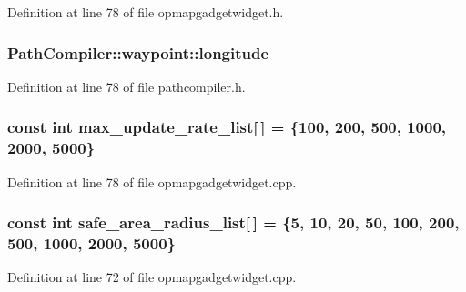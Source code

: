 Definition at line 78 of file opmapgadgetwidget.\-h.

\hypertarget{group___o_p_map_plugin_ga698954b834d77d2eb539e287bc6bc9e0}{
\subsubsection[{longitude}]{ Path\-Compiler\-::waypoint\-::longitude}}\label{group___o_p_map_plugin_ga698954b834d77d2eb539e287bc6bc9e0}


Definition at line 78 of file pathcompiler.\-h.

\hypertarget{group___o_p_map_plugin_ga924197d237c4236b05e045cf5b299e51}{
\subsubsection[{max\-\_\-update\-\_\-rate\-\_\-list}]{\setlength{\rightskip}{0pt plus 5cm}const {\bf int} max\-\_\-update\-\_\-rate\-\_\-list\mbox{[}$\,$\mbox{]} = \{100, 200, 500, 1000, 2000, 5000\}}}\label{group___o_p_map_plugin_ga924197d237c4236b05e045cf5b299e51}


Definition at line 78 of file opmapgadgetwidget.\-cpp.

\hypertarget{group___o_p_map_plugin_ga508cdf04246e0731ce2b58e5d72844d6}{
\subsubsection[{safe\-\_\-area\-\_\-radius\-\_\-list}]{\setlength{\rightskip}{0pt plus 5cm}const {\bf int} safe\-\_\-area\-\_\-radius\-\_\-list\mbox{[}$\,$\mbox{]} = \{5, 10, 20, 50, 100, 200, 500, 1000, 2000, 5000\}}}\label{group___o_p_map_plugin_ga508cdf04246e0731ce2b58e5d72844d6}


Definition at line 72 of file opmapgadgetwidget.\-cpp.

